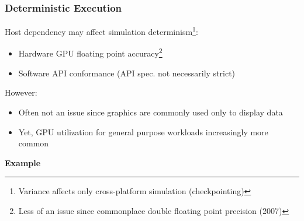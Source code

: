 
\begin{frame}

\frametitle{Deterministic Execution}

Host dependency may affect simulation determinism\footnote{Variance affects only cross-platform simulation (checkpointing)}:
\begin{itemize}
	\item Hardware GPU floating point accuracy\footnote{Less of an issue since commonplace double floating point precision (2007)}
	\item Software API conformance (API spec. not necessarily strict)
\end{itemize}

However:
\begin{itemize}
	\item Often not an issue since graphics are commonly used only to display data
	\item Yet, GPU utilization for general purpose workloads increasingly more common
\end{itemize}

\textbf{Example}

\end{frame}
